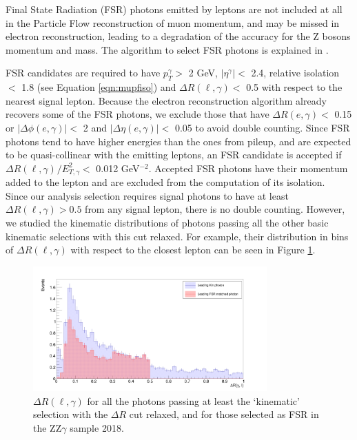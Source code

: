 Final State Radiation (FSR) photons emitted by leptons are not included at all in the Particle Flow reconstruction of muon momentum, and may be missed in electron reconstruction, leading to a degradation of the accuracy for the Z bosons momentum and mass.
The algorithm to select FSR photons is explained in
.

FSR candidates are required to have $p_{T}^{\gamma} >$ 2 GeV, $|\eta^{\gamma}| <$ 2.4, relative isolation $<$ 1.8 (see Equation \ref{eqn:mupfiso}) and $\Delta R(\ell, \gamma) <$ 0.5 with respect to the nearest signal lepton.
Because the electron reconstruction algorithm already recovers some of the FSR photons, we exclude those that have $\Delta R(e, \gamma) <$ 0.15 or $|\Delta\phi(e, \gamma)| <$ 2 and $|\Delta\eta(e, \gamma)| <$ 0.05 to avoid double counting.
Since FSR photons tend to have higher energies than the ones from pileup, and are expected to be quasi-collinear with the emitting leptons, an FSR candidate is accepted if $\Delta R(\ell, \gamma)^{} / E_{T,\gamma}^{2} <$ 0.012 GeV$^{-2}$.
Accepted FSR photons have their momentum added to the lepton and are excluded from the computation of its isolation.
\\
Since our analysis selection requires signal photons to have at least $\Delta R(\ell, \gamma) > 0.5$ from any signal lepton, there is no double counting.
However, we studied the kinematic distributions of photons passing all the other basic kinematic selections with this cut relaxed.
For example, their distribution in bins of $\Delta R(\ell, \gamma)$ with respect to the closest lepton
can be seen in Figure \ref{fig:dRl_fsr_photons}.
\begin{figure}[ht]
\begin{center}
        \includegraphics[width=0.8\textwidth]{Figures/lead_dRl_kin_vs_fsrMatched_rebinned.png}
\end{center}
\caption{$\Delta R(\ell, \gamma)$ for all the photons passing at least the `kinematic' selection with the $\Delta R$ cut relaxed, and for those selected as FSR in the ZZ$\gamma$ sample 2018.}
\label{fig:dRl_fsr_photons}
\end{figure}
